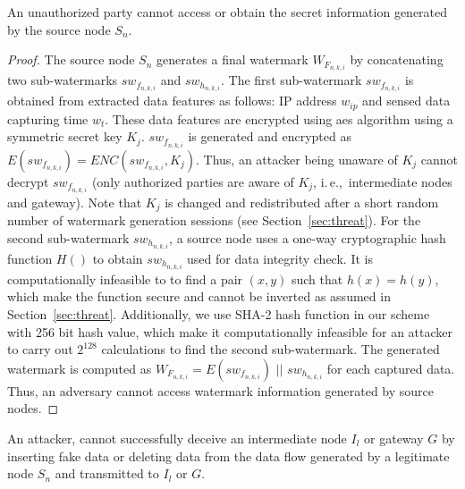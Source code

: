 \documentclass{llncs}
\newcommand{\ie}{i.\,e.,~}
\begin{document}
\begin{theorem}
An unauthorized party cannot access or obtain the secret information generated by the source node $S_n$.
\end{theorem}

\begin{proof}
The source node $S_n$ generates a final watermark $W_{F_{n,k,i}}$ by concatenating two sub-watermarks $sw_{f_{n,k,i}}$ and $sw_{h_{n,k,i}}$. The first sub-watermark $sw_{f_{n,k,i}}$ is obtained from extracted data features as follows: IP address $w_{ip}$ and sensed data capturing time $w_{t}$. These data features are encrypted using \gls*{aes} algorithm using a symmetric secret key $K_j$. $sw_{f_{n,k,i}}$ is generated and encrypted as $E(sw_{f_{n,k,i}}) = ENC(sw_{f_{n,k,i}},K_j)$. Thus, an attacker being unaware of $K_j$ cannot decrypt $sw_{f_{n,k,i}}$ (only authorized parties are aware of $K_j$, \ie intermediate nodes and gateway). Note that $K_j$ is changed and redistributed after a short random number of watermark generation sessions (see Section~\ref{sec:threat}). For the second sub-watermark $sw_{h_{n,k,i}}$, a source node uses a one-way cryptographic hash function $H()$ to obtain $sw_{h_{n,k,i}}$ used for data integrity check. It is computationally infeasible to to find a pair $(x,y)$ such that $h(x) = h(y)$, which make the function secure and cannot be inverted as assumed in Section~\ref{sec:threat}. Additionally, we use SHA-2 hash function in our scheme with 256 bit hash value, which make it computationally infeasible for an attacker to carry out $2^{128}$ calculations to find the second sub-watermark. The generated watermark is computed as $W_{F_{n,k,i}} = E(sw_{f_{n,k,i}})$ $ || $ $sw_{h_{n,k,i}}$ for each captured data. Thus, an adversary cannot access watermark information generated by source nodes.      
\end{proof}

\begin{theorem}
An attacker, cannot successfully deceive an intermediate node $I_l$ or gateway $G$ by inserting fake data or deleting data from the data flow generated by a legitimate node $S_n$ and transmitted to $I_l$ or $G$.
\end{theorem}
\end{document}
